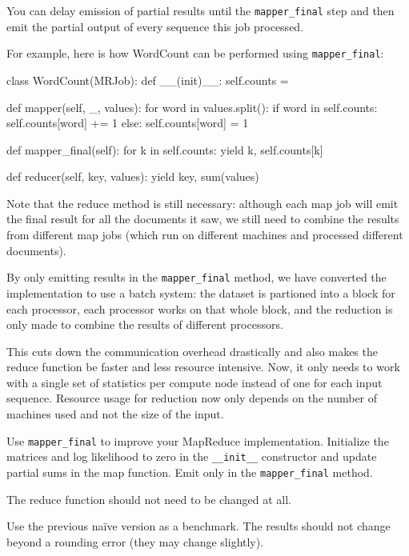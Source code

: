 You can delay emission of partial results until the \verb+mapper_final+ step and
then emit the partial output of every sequence this job processed.

For example, here is how WordCount can be performed using \verb+mapper_final+:

\begin{python}
class WordCount(MRJob):
    def __(init)__:
        self.counts = {}
    
    def mapper(self, _, values):
        for word in values.split():
            if word in self.counts:
                self.counts[word] += 1
            else:
                self.counts[word] = 1

    def mapper_final(self):
        for k in self.counts:
            yield k, self.counts[k]

    def reducer(self, key, values):
        yield key, sum(values)
\end{python}

Note that the reduce method is still necessary: although each map job will emit
the final result for all the documents it saw, we still need to combine the
results from different map jobs (which run on different machines and processed
different documents).

By only emitting results in the \verb+mapper_final+ method, we have converted the
implementation to use a batch system: the dataset is partioned into a block for
each processor, each processor works on that whole block, and the reduction is
only made to combine the results of different processors.

This cuts down the communication overhead drastically and also makes the reduce
function be faster and less resource intensive. Now, it only needs to work with
a single set of statistics per compute node instead of one for each input
sequence. Resource usage for reduction now only depends on the number of
machines used and not the size of the input.

\begin{exercise}
Use \verb+mapper_final+ to improve your MapReduce implementation. Initialize the
matrices and log likelihood to zero in the \verb+__init__+ constructor and update partial sums
in the map function. Emit only in the \verb+mapper_final+ method.

The reduce function should not need to be changed at all.

Use the previous na\"{i}ve version as a benchmark. The results should not change
beyond a rounding error (they may change slightly).
\end{exercise}

